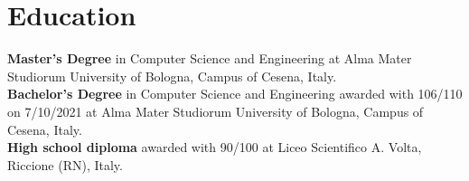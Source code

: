 \documentclass[curriculum-vitae-eng]{subfiles}
\begin{document}
	\section*{Education}
		 \textbf{Master's Degree} in Computer Science and Engineering at Alma Mater Studiorum University of Bologna, Campus of Cesena, Italy.\\
		
		 \textbf{Bachelor's Degree} in Computer Science and Engineering awarded with 106/110 on 7/10/2021 at Alma Mater Studiorum University of Bologna, Campus of Cesena, Italy.\\

		 \textbf{High school diploma} awarded with 90/100 at Liceo Scientifico A. Volta, Riccione (RN), Italy.
		
		\iffalse
		\subsection*{Exams taken during bachelor's degree}
			\begin{minipage}[t]{.47\textwidth}
				\exam{Algebra and Geometry}{26}
				\exam{Algorithms and Data Structures}{31}
				\exam{Mathematical Analysis}{27}
				\exam{Computer Achitectures}{29}
				\exam{Databases}{30}
				\exam{Computer Graphics}{28}
				\exam{Cryptography}{30}
				\exam{Physics}{31}
				\exam{High-Performance Computing}{30}
				\exam{Software engineering}{23}
			\end{minipage}
			\hfill
			\begin{minipage}[t]{.47\textwidth}
				\exam{Discrete Mathematics and Probability}{25}
				\exam{Numerical Algorithms}{22}
				\exam{Programming}{28}
				\exam{Object-oriented Programming}{28}
				\exam{Data-intensive Applications}{27}
				\exam{Network Programming}{28}
				\exam{Telecommunication networks}{23}
				\exam{Operations Research}{26}
				\exam{Operating Systems}{24}
				\exam{Web Technologies}{24}
			\end{minipage}
		\fi
\end{document}
